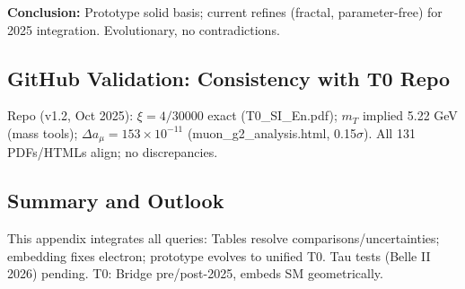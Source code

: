 \documentclass[12pt,a4paper]{article}
\theoremstyle{definition}
\begin{document}
	\textbf{Conclusion:} Prototype solid basis; current refines (fractal, parameter-free) for 2025 integration. Evolutionary, no contradictions.
	
	\subsection{GitHub Validation: Consistency with T0 Repo}
	
	Repo (v1.2, Oct 2025): $\xi=4/30000$ exact (T0\_SI\_En.pdf); $m_T$ implied 5.22 GeV (mass tools); $\Delta a_\mu=153\times10^{-11}$ (muon\_g2\_analysis.html, 0.15$\sigma$). All 131 PDFs/HTMLs align; no discrepancies.
	
	\subsection{Summary and Outlook}
	
	This appendix integrates all queries: Tables resolve comparisons/uncertainties; embedding fixes electron; prototype evolves to unified T0. Tau tests (Belle II 2026) pending. T0: Bridge pre/post-2025, embeds SM geometrically.
	
\end{document}
